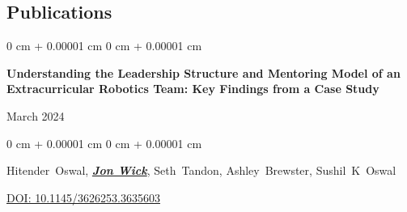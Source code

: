\documentclass[10pt, article]{article}
\newenvironment{onecolentry}{
    \begin{adjustwidth}{
        0 cm + 0.00001 cm
    }{
        0 cm + 0.00001 cm
    }
}{
    \end{adjustwidth}
} %
\newenvironment{twocolentry}[2][]{
    \onecolentry
    \def\secondColumn{#2}
    \setcolumnwidth{\fill, 4.5 cm}
    \begin{paracol}{2}
}{
    \switchcolumn \raggedleft \secondColumn
    \end{paracol}
    \endonecolentry
} %
\begin{document}
   \begin{samepage}
      \section{Publications}




         \begin{twocolentry}{
             March 2024
         }
             \textbf{Understanding the Leadership Structure and Mentoring Model of an Extracurricular Robotics Team: Key Findings from a Case Study}
         \end{twocolentry}

         \vspace{0.10 cm}

         \begin{onecolentry}
           \mbox{Hitender Oswal}, \underline{\textbf{\textit{Jon Wick}}}, \mbox{Seth Tandon}, \mbox{Ashley Brewster}, \mbox{Sushil K Oswal}

             \vspace{0.10 cm}

         \href{https://doi.org/10.1145/3626253.3635603}{DOI: 10.1145/3626253.3635603}
     \end{onecolentry}
   \end{samepage}
\end{document}
